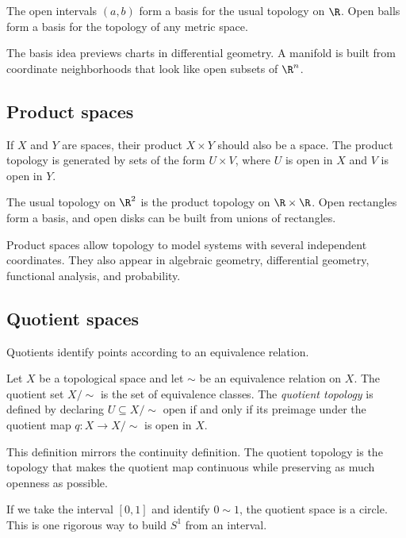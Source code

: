 \begin{example}
The open intervals $(a,b)$ form a basis for the usual topology on $\R$.
Open balls form a basis for the topology of any metric space.
\end{example}

The basis idea previews charts in differential geometry. A manifold is built
from coordinate neighborhoods that look like open subsets of $\R^n$.

\subsection{Product spaces}

If $X$ and $Y$ are spaces, their product $X\times Y$ should also be a space.
The product topology is generated by sets of the form $U\times V$, where $U$ is
open in $X$ and $V$ is open in $Y$.

\begin{example}
The usual topology on $\R^2$ is the product topology on $\R\times\R$. Open
rectangles form a basis, and open disks can be built from unions of rectangles.
\end{example}

Product spaces allow topology to model systems with several independent
coordinates. They also appear in algebraic geometry, differential geometry,
functional analysis, and probability.

\subsection{Quotient spaces}

Quotients identify points according to an equivalence relation.

\begin{definition}
Let $X$ be a topological space and let $\sim$ be an equivalence relation on
$X$. The quotient set $X/{\sim}$ is the set of equivalence classes. The
\emph{quotient topology} is defined by declaring $U\subseteq X/{\sim}$ open
if and only if its preimage under the quotient map $q:X\to X/{\sim}$ is open
in $X$.
\end{definition}

This definition mirrors the continuity definition. The quotient topology is the
topology that makes the quotient map continuous while preserving as much openness
as possible.

\begin{example}
If we take the interval $[0,1]$ and identify $0\sim 1$, the quotient space is a
circle. This is one rigorous way to build $S^1$ from an interval.
\end{example}

